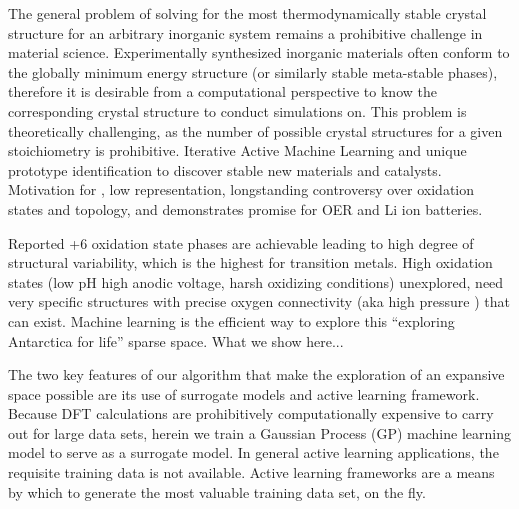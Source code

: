 

The general problem of solving for the most thermodynamically stable crystal structure for an arbitrary inorganic system remains a prohibitive challenge in material science.
%
Experimentally synthesized inorganic materials often conform to the globally minimum energy structure (or similarly stable meta-stable phases),
therefore it is desirable from a computational perspective to know the corresponding crystal structure to conduct simulations on.
%
This problem is theoretically challenging, as the number of possible crystal structures for a given stoichiometry is prohibitive.
%
Iterative Active Machine Learning and unique prototype identification to discover stable new materials and catalysts.
%
Motivation for , low representation, longstanding controversy over oxidation states and topology, and demonstrates promise for OER and Li ion batteries.


Reported +6 oxidation state phases are achievable leading to high degree of structural variability, which is the highest for transition metals.
%
High oxidation states (low pH high anodic voltage, harsh oxidizing conditions) unexplored, need very specific structures with precise oxygen connectivity (aka high pressure ) that can exist.
%
Machine learning is the efficient way to explore this “exploring Antarctica for life” sparse space.
%
What we show here...


The two key features of our algorithm that make the exploration of an expansive space possible are its use of surrogate models and active learning framework.
%
Because DFT calculations are prohibitively computationally expensive to carry out for large data sets, herein we train a Gaussian Process (GP) machine learning model to serve as a surrogate model.
%
In general active learning applications, the requisite training data is not available.
%
Active learning frameworks are a means by which to generate the most valuable training data set, on the fly.


